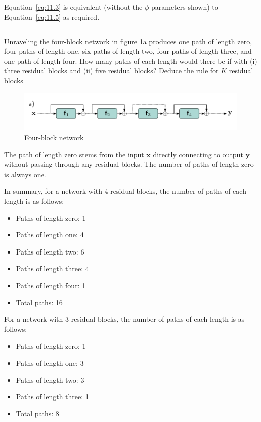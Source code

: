 \documentclass[12pt]{report}
\begin{document}
Equation~\eqref{eq:11.3} is equivalent (without the $\phi$ parameters shown) to Equation~\eqref{eq:11.5} as required.

\newpage

\subsection{}
\begin{mdframed}
    Unraveling the four-block network in figure 1a produces one path of length zero, four paths of length one, six paths of length two, four paths of length three, and one path of length four. How many paths of each length would there be if with (i) three residual blocks and (ii) five residual blocks? Deduce the rule for $K$ residual blocks
\end{mdframed}

\begin{figure}[ht]
    \centering
    \includegraphics[width=\textwidth]{11_4.png}
    \caption{Four-block network}
    \label{fig:11.4a}
\end{figure}

The path of length zero stems from the input $\mathbf{x}$ directly connecting to output $\mathbf{y}$ without passing through any residual blocks. The number of paths of length zero is always one.

In summary, for a network with 4 residual blocks, the number of paths of each length is as follows:

\begin{itemize}
    \item Paths of length zero: 1
    \item Paths of length one: 4
    \item Paths of length two: 6
    \item Paths of length three: 4
    \item Paths of length four: 1
    \item Total paths: 16
\end{itemize}

For a network with 3 residual blocks, the number of paths of each length is as follows:

\begin{itemize}
    \item Paths of length zero: 1
    \item Paths of length one: 3
    \item Paths of length two: 3
    \item Paths of length three: 1
    \item Total paths: 8
\end{itemize}
\end{document}
